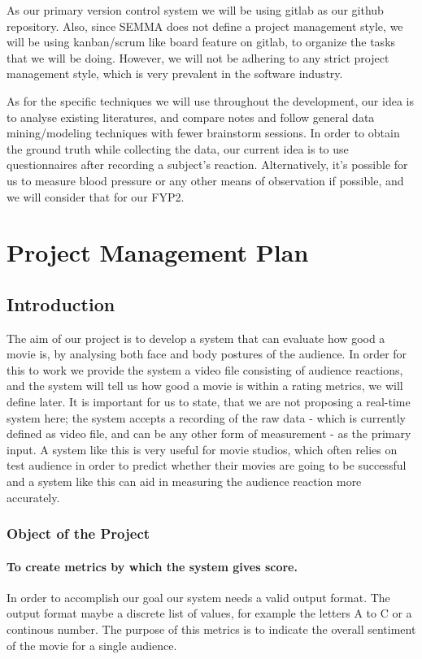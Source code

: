 \documentclass[12pt,a4paper,man]{report}
\begin{document}
As our primary version control system we will be using gitlab as our github repository. Also, since SEMMA does not define a project management style, we will be using kanban/scrum like board feature on gitlab, to organize the tasks that we will be doing. However, we will not be adhering to any strict project management style, which is very prevalent in the software industry.

As for the specific techniques we will use throughout the development, our idea is to analyse existing literatures, and compare notes and follow general data mining/modeling techniques with fewer brainstorm sessions. In order to obtain the ground truth while collecting the data, our current idea is to use questionnaires after recording a subject’s reaction. Alternatively, it’s possible for us to measure blood pressure or any other means of observation if possible, and we will consider that for our FYP2.

\part{Project Management Plan}
\label{sec:org780e24b}
\chapter{Introduction}
\label{sec:org1a5b9cb}
The aim of our project is to develop a system that can evaluate how good a movie is, by analysing both face and body postures of the audience. In order for this to work we provide the system a video file consisting of audience reactions, and the system will tell us how good a movie is within a rating metrics, we will define later. It is important for us to state, that we are not proposing a real-time system here; the system accepts a recording of the raw data - which is currently defined as video file, and can be any other form of measurement - as the primary input. A system like this is very useful for movie studios, which often relies on test audience in order to predict whether their movies are going to be successful and a system like this can aid in measuring the audience reaction more accurately. 

\section{Object of the Project}
\label{sec:org8bf0c62}
\subsection{To create metrics by which the system gives score.}
\label{sec:org07e60a7}
In order to accomplish our goal our system needs a valid output format. The output format maybe a discrete list of values, for example the letters A to C or a continous number. The purpose of this metrics is to indicate the overall sentiment of the movie for a single audience. 
\end{document}

